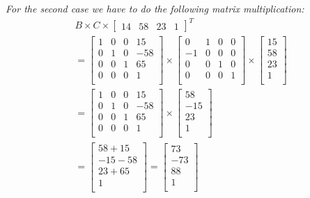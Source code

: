 \documentclass[a4paper,10pt]{article}
\begin{document}
\textit{For the second case we have to do the following matrix multiplication:} 
\begin{align*}
B \times C \times \left[\begin{array}{cccc} 14 &58 &23 &1\end{array}\right]^{T} \\
%
=
\left[\begin{array}{cccc}
  1 	& 0 	& 0 	& 15\\ 
  0 	& 1	& 0 	& -58\\
  0 	& 0 	& 1 	& 65\\
  0 	& 0 	& 0 	& 1\\
\end{array}\right]
\times
\left[\begin{array}{cccc}
  0 	& 1 	& 0 	& 0\\ 
  -1 	& 0	& 0 	& 0\\
  0 	& 0 	& 1 	& 0\\
  0 	& 0 	& 0 	& 1\\
\end{array}\right]
\times
\left[\begin{array}{c}
15\\ 58\\ 23\\ 1\\
\end{array}\right] \\
%
=
\left[\begin{array}{cccc}
  1 	& 0 	& 0 	& 15\\ 
  0 	& 1	& 0 	& -58\\
  0 	& 0 	& 1 	& 65\\
  0 	& 0 	& 0 	& 1\\
\end{array}\right]
\times
\left[\begin{array}{c}
58\\ -15\\ 23\\ 1\\
\end{array}\right] \\
%
= 
\left[\begin{array}{c}
58+15\\ -15-58\\ 23+65\\ 1\\
\end{array}\right] 
=
\left[\begin{array}{c}
73\\ -73\\ 88\\ 1\\
\end{array}\right]
\end{align*}
\end{document}
